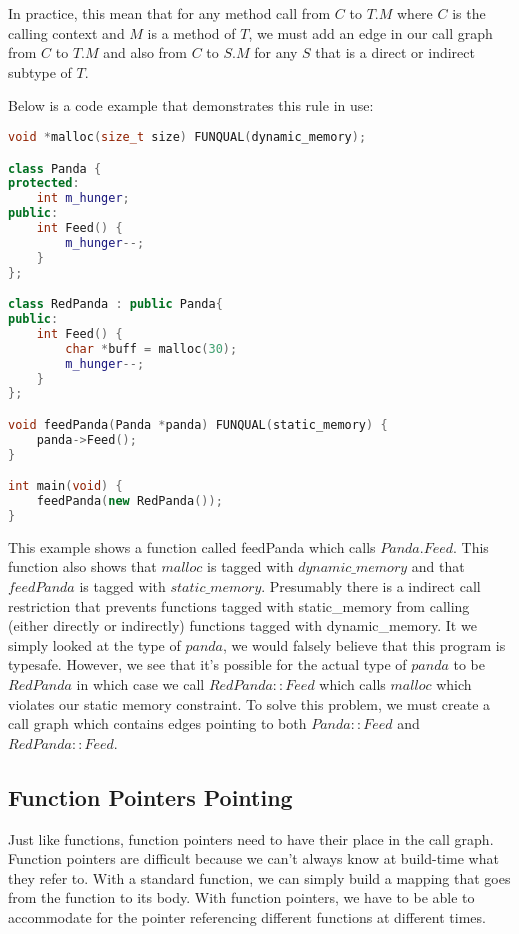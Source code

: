 In practice, this mean that for any method call from $C$ to $T.M$ where $C$ is the calling context and $M$ is a method of $T$, we must add an edge in our call graph from $C$ to $T.M$ and also from $C$ to $S.M$ for any $S$ that is a direct or indirect subtype of $T$.  

Below is a code example that demonstrates this rule in use:

\begin{minipage}[c]{0.95\textwidth}
\begin{lstlisting}[language=C++]
void *malloc(size_t size) FUNQUAL(dynamic_memory);

class Panda {
protected:
    int m_hunger;
public:
    int Feed() {
        m_hunger--;
    }
};

class RedPanda : public Panda{
public:
    int Feed() {
        char *buff = malloc(30);
        m_hunger--;
    }
};

void feedPanda(Panda *panda) FUNQUAL(static_memory) {
    panda->Feed();
}

int main(void) {
    feedPanda(new RedPanda());
}
\end{lstlisting}
\end{minipage}

This example shows a function called feedPanda which calls $Panda.Feed$.  This function also shows that $malloc$ is tagged with $dynamic\_memory$ and that $feedPanda$ is tagged with $static\_memory$.  Presumably there is a indirect call restriction that prevents functions tagged with static\_memory from calling (either directly or indirectly) functions tagged with dynamic\_memory.  It we simply looked at the type of $panda$, we would falsely believe that this program is typesafe.  However, we see that it's possible for the actual type of $panda$ to be $RedPanda$ in which case we call $RedPanda::Feed$ which calls $malloc$ which violates our static memory constraint.  To solve this problem, we must create a call graph which contains edges pointing to both $Panda::Feed$ and $RedPanda::Feed$.

\subsection{Function Pointers Pointing}

Just like functions, function pointers need to have their place in the call graph.  Function pointers are difficult because we can't always know at build-time what they refer to.  With a standard function, we can simply build a mapping that goes from the function to its body.  With function pointers, we have to be able to accommodate for the pointer referencing different functions at different times.

